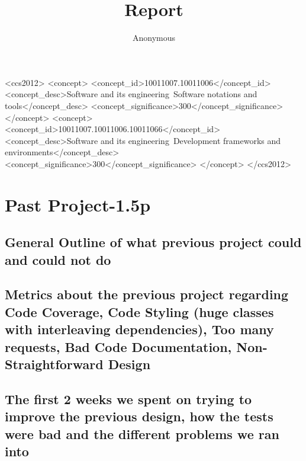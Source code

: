 \documentclass[sigconf]{acmart}
\begin{document}
\title{Report}

\author{Anonymous}

\newcommand\FIXME[1]{{\color{red}\textbf{FIXME: #1}}}

%
%
\begin{CCSXML}
<ccs2012>
<concept>
<concept_id>10011007.10011006</concept_id>
<concept_desc>Software and its engineering~Software notations and tools</concept_desc>
<concept_significance>300</concept_significance>
</concept>
<concept>
<concept_id>10011007.10011006.10011066</concept_id>
<concept_desc>Software and its engineering~Development frameworks and environments</concept_desc>
<concept_significance>300</concept_significance>
</concept>
</ccs2012>
\end{CCSXML}



\maketitle

\tableofcontents 

\section{Past Project-1.5p}
\subsection{General Outline of what previous project could and could not do}
\subsection{Metrics about the previous project regarding Code Coverage, Code Styling (huge classes with interleaving dependencies), Too many requests, Bad Code Documentation, Non-Straightforward Design}
\subsection{The first 2 weeks we spent on trying to improve the previous design, how the tests were bad and the different problems we ran into}
\end{document}
